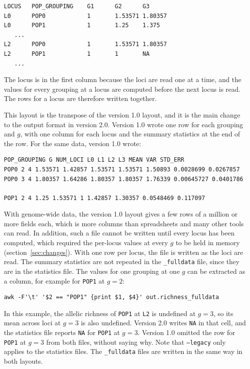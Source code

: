 \documentclass[11pt]{article}
\newcommand{\flag}[1]{\texttt{#1}}
\begin{document}
\begin{Verbatim}[xleftmargin=1em,fontsize=\small]
LOCUS   POP_GROUPING    G1      G2      G3
L0      POP0            1       1.53571 1.80357
L0      POP1            1       1.25    1.375
   ...
L2      POP0            1       1.53571 1.80357
L2      POP1            1       1       NA
   ...
\end{Verbatim}

\noindent The locus is in the first column because the loci are read one at a
time, and the values for every grouping at a locus are computed before the
next locus is read. The rows for a locus are therefore written together.

This layout is the transpose of the version 1.0 layout, and it is the main
change to the output format in version 2.0. Version 1.0 wrote one row for each
grouping and $g$, with one column for each locus and the summary statistics at
the end of the row. For the same data, version 1.0 wrote:

\begin{Verbatim}[xleftmargin=1em,fontsize=\footnotesize]
POP_GROUPING G NUM_LOCI L0 L1 L2 L3 MEAN VAR STD_ERR
POP0 2 4 1.53571 1.42857 1.53571 1.53571 1.50893 0.0028699 0.0267857
POP0 3 4 1.80357 1.64286 1.80357 1.80357 1.76339 0.00645727 0.0401786

POP1 2 4 1.25 1.53571 1 1.42857 1.30357 0.0548469 0.117097
\end{Verbatim}

\noindent With genome-wide data, the version 1.0 layout gives a few rows of a
million or more fields each, which is more columns than spreadsheets and many
other tools can read. In addition, such a file cannot be written until every
locus has been computed, which required the per-locus values at every $g$ to be
held in memory (section~\ref{sec:changes}). With one row per locus, the file is
written as the loci are read. The summary statistics are not repeated in the
\texttt{\_fulldata} file, since they are in the statistics file. The values
for one grouping at one $g$ can be extracted as a column, for example for
\texttt{POP1} at $g = 2$:

\begin{Verbatim}[xleftmargin=1em,fontsize=\small]
awk -F'\t' '$2 == "POP1" {print $1, $4}' out.richness_fulldata
\end{Verbatim}

\noindent In this example, the allelic richness of \texttt{POP1} at
\texttt{L2} is undefined at $g = 3$, so its mean across loci at $g = 3$ is also
undefined. Version 2.0 writes \texttt{NA} in that cell, and the statistics file
reports \texttt{NA} for \texttt{POP1} at $g = 3$. Version 1.0 omitted the row
for \texttt{POP1} at $g = 3$ from both files, without saying why. Note that
\flag{--legacy} only applies to the statistics files. The \texttt{\_fulldata}
files are written in the same way in both layouts.
\end{document}
